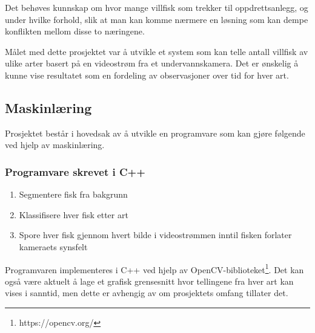 Det behøves kunnskap om hvor mange villfisk som trekker til oppdrettsanlegg, og under hvilke forhold, slik at man kan komme nærmere en løsning som kan dempe konflikten mellom disse to næringene. 

Målet med dette prosjektet var å utvikle et system som kan telle antall villfisk av ulike arter basert på en videostrøm fra et undervannskamera. Det er ønskelig å kunne vise resultatet som en fordeling av observasjoner over tid for hver art. 

\subsection{Maskinlæring}

Prosjektet består i hovedsak av å utvikle en programvare som kan gjøre følgende ved hjelp av maskinlæring.

\subsubsection{Programvare skrevet i C++}


\begin{enumerate}
\item Segmentere fisk fra bakgrunn
\item Klassifisere hver fisk etter art
\item Spore hver fisk gjennom hvert bilde i videostrømmen inntil fisken forlater kameraets synsfelt
\end{enumerate}

Programvaren implementeres i C++ ved hjelp av OpenCV-biblioteket\footnote{https://opencv.org/}. Det kan også være aktuelt å lage et grafisk grensesnitt hvor tellingene fra hver art kan vises i sanntid, men dette er avhengig av om prosjektets omfang tillater det. 